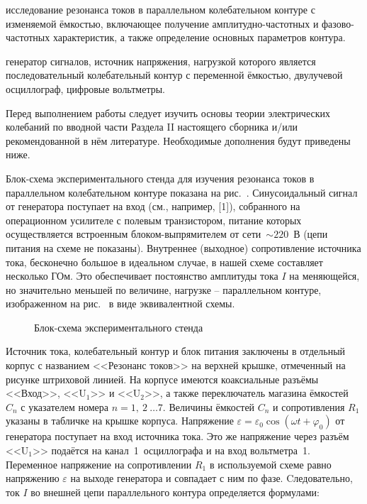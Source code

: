 
\begin{lab:aim}
	исследование резонанса токов в параллельном колебательном контуре с
изменяемой ёмкостью, включающее получение амплитудно-частотных и
фазово-частотных характеристик, а также определение основных параметров контура.
\end{lab:aim}

\begin{lab:equipment}
	генератор сигналов, источник напряжения, нагрузкой которого является
последовательный колебательный контур с переменной ёмкостью, двулучевой
осциллограф, цифровые вольтметры.
\end{lab:equipment}

	Перед выполнением работы следует изучить основы теории электрических
колебаний по вводной части Раздела II настоящего сборника и/или рекомендованной
в нём литературе. Необходимые дополнения будут приведены ниже.

\experiment
Блок-схема экспериментального стенда для изучения резонанса токов в параллельном
колебательном контуре показана на рис.~. Синусоидальный сигнал
от генератора поступает на вход  (см., например, [1]), собранного на операционном усилителе с полевым
транзистором, питание которых осуществляется встроенным блоком-выпрямителем от
сети~$\sim220$~В (цепи питания на схеме не показаны).  Внутреннее (выходное)
сопротивление источника тока, бесконечно большое в идеальном случае, в нашей
схеме составляет несколько ГОм. Это обеспечивает постоянство амплитуды тока $I$
на меняющейся, но значительно меньшей по величине, нагрузке – параллельном
контуре, изображенном на рис.~ в виде эквивалентной схемы.

\begin{figure}[h!]
	\caption{Блок-схема экспериментального стенда}
\end{figure}


Источник тока, колебательный контур и блок питания заключены в отдельный корпус
с названием <<Резонанс токов>> на верхней крышке, отмеченный на рисунке
штриховой линией. На корпусе имеются коаксиальные разъёмы <<Вход>>,
<<$\text{U}_1$>> и <<$\text{U}_2$>>, а также переключатель магазина ёмкостей
$C_n$ с указателем номера $n=1,~2~\ldots7.$ Величины ёмкостей $C_n$ и
сопротивления $R_1$ указаны в табличке на крышке корпуса. Напряжение
$\varepsilon=\varepsilon_0\cos(\omega t+\varphi_0)$ от генератора поступает на
вход источника тока. Это же напряжение через разъём <<$\text{U}_1$>> подаётся на
канал~1~осциллографа и на вход вольтметра~1. Переменное напряжение на
сопротивлении $R_1$ в используемой схеме равно напряжению $\varepsilon$ на
выходе генератора и совпадает с ним по фазе. Cледовательно, ток $I$ во внешней
цепи параллельного контура определяется формулами:

